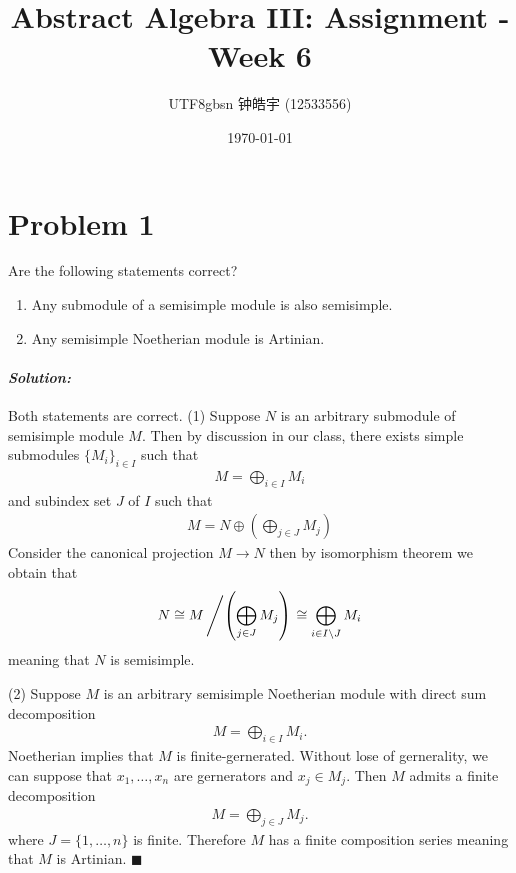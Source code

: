 \documentclass[12pt, a4paper]{article}
\title{Abstract Algebra III: Assignment - Week 6}
\author{
    \begin{CJK*}{UTF8}{gbsn}
    钟皓宇 (12533556)
    \end{CJK*}
}
\date{\today}
\theoremstyle{remark}
\newenvironment{solution}
  {\paragraph{\textit{Solution:}}\par\medskip}
  {\hfill$\blacksquare$\vspace{0.1cm}}
\begin{document}
\maketitle

\section*{Problem 1}
Are the following statements correct?
\begin{enumerate}
    \item[(1)] Any submodule of a semisimple module is also semisimple.
    \item[(2)] Any semisimple Noetherian module is Artinian.
\end{enumerate}

\begin{solution}
    Both statements are correct.
    (1) Suppose $N$ is an arbitrary submodule of semisimple module $M$. Then by discussion in our class, there exists simple submodules $\{M_i\}_{i\in I}$
    such that 
    \begin{align*}
        M = \bigoplus_{i\in I} M_i 
    \end{align*}
    and subindex set $J$ of $I$ such that 
    \begin{align*}
        M= N\oplus  \left(\bigoplus_{j\in J} M_j\right)
    \end{align*}
    Consider the canonical projection $M\to N$ then by isomorphism theorem we obtain that 
    \begin{align*}
        N \cong M\left/ \left(\bigoplus_{j\in J} M_j\right) \right .\cong \bigoplus_{i\in I\setminus J} M_i 
    \end{align*}
    meaning that $N$ is semisimple.

    (2) Suppose $M$ is an arbitrary semisimple Noetherian module with direct sum decomposition
    \begin{align*}
        M = \bigoplus_{i\in I} M_i.
    \end{align*}
    Noetherian implies that $M$ is finite-gernerated. Without lose of gernerality, we can suppose that $x_1,\dots,x_n$ are gernerators and $x_j\in M_j$.
    Then $M$ admits a finite decomposition
    \begin{align*}
        M = \bigoplus_{j\in J} M_j.
    \end{align*}
    where $J=\{1,\dots,n\}$ is finite. Therefore $M$ has a finite composition series meaning that $M$ is Artinian.
\end{solution}
\end{document}
